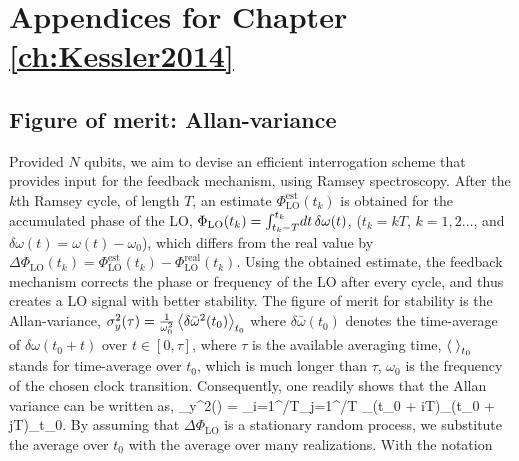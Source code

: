 \chapter{Appendices for Chapter \ref{ch:Kessler2014}}
\label{app:Kessler2014}

\section{Figure of merit: Allan-variance}
Provided $N$ qubits, we aim to devise an efficient interrogation scheme that
provides input for the feedback mechanism, using Ramsey spectroscopy. After the
$k$th Ramsey cycle, of length $T$, an estimate $\Phi^\mathrm{est}_\mathrm{LO}(t_k)$
is obtained for the accumulated phase of the LO, $\Phi_\mathrm{LO}(t_k) =
\intop_{t_k-T}^{t_k}\d{t}\delta\omega(t)$, ($t_k = kT$, $k=1,2\dots$, and
$\delta\omega(t) =\omega(t)- \omega_0$), which differs from the real value by
$\Delta\Phi_\mathrm{LO}(t_k) = \Phi^\mathrm{est}_\mathrm{LO}(t_k) -
\Phi^\mathrm{real}_\mathrm{LO}(t_k)$.
Using the obtained estimate, the feedback mechanism corrects the phase or
frequency of the LO after every cycle, and thus creates a LO signal with better
stability.
The figure of merit for stability is the Allan-variance,
$ 
	\sigma_y^2(\tau) = \frac{1}{\omega_0^2}
	\left< \delta\bar\omega^2(t_0) \right>_{t_0}
$
where $\delta\bar\omega(t_0)$ denotes the time-average of $\delta\omega(t_0 +
t)$ over $t\in[0,\tau]$, where $\tau$ is the available averaging time,
$\left< \; \right>_{t_0}$ stands for time-average over $t_0$, which is much longer than
 $\tau$, $\omega_0$ is the frequency of the chosen
clock transition. Consequently, one readily shows that the Allan variance can be written as,
\bel
	\sigma_y^2(\tau) = 
	\sum_{i=1}^{\tau/T}\sum_{j=1}^{\tau/T} \Big\langle\Delta\Phi_(t_0 +
	iT)\Delta\Phi_(t_0 + jT)\Big\rangle_{t_0}.
\eel
By assuming that $\Delta\Phi_\mathrm{LO}$ is a stationary random process, we
substitute the average over $t_0$ with the average over many realizations. With the notation
